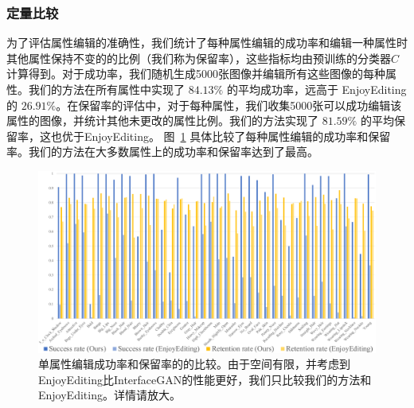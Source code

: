\subsubsection{定量比较}
为了评估属性编辑的准确性，我们统计了每种属性编辑的成功率和编辑一种属性时其他属性保持不变的的比例（我们称为保留率），这些指标均由预训练的分类器$C$计算得到。对于成功率，我们随机生成5000张图像并编辑所有这些图像的每种属性。我们的方法在所有属性中实现了 $84.13\%$ 的平均成功率，远高于 En​​joyEditing 的 $26.91\%$。在保留率的评估中，对于每种属性，我们收集5000张可以成功编辑该属性的图像，并统计其他未更改的属性比例。我们的方法实现了 $81.59\%$ 的平均保留率，这也优于EnjoyEditing。 图~\ref{fig:zhuzhuang} 具体比较了每种属性编辑的成功率和保留率。我们的方法在大多数属性上的成功率和保留率达到了最高。

\begin{figure}[!t]
    \begin{center}
         \includegraphics[width=1\linewidth]{figures/ACGAN/excel_zhuzhuang.pdf}
    \end{center}
    \caption{单属性编辑成功率和保留率的的比较。由于空间有限，并考虑到EnjoyEditing比InterfaceGAN的性能更好，我们只比较我们的方法和EnjoyEditing。详情请放大。}
    \label{fig:zhuzhuang}
\end{figure}

